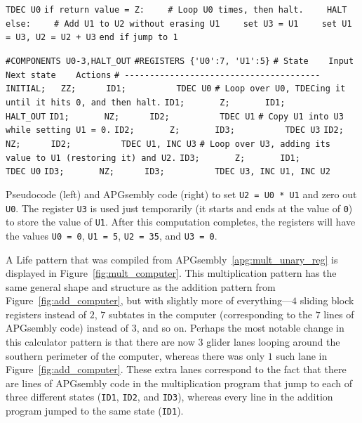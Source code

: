 \begin{apgsembly}
	\centering
	\begin{minipage}[t]{.49\textwidth}
		\begin{algorithmic}[1]\small
			\State\texttt{TDEC U0}
			\State\texttt{if return value = Z:}
			\State\texttt{~~~~\# Loop U0 times, then halt.}
			\State\texttt{~~~~HALT}
			\State\texttt{else:}
			\State\texttt{~~~~\# Add U1 to U2 without erasing U1}
			\State\texttt{~~~~set U3 = U1}
			\State\texttt{~~~~set U1 = U3, U2 = U2 + U3}
			\State\texttt{end if}
			\State\texttt{jump to 1}
		\end{algorithmic}
	\end{minipage}\hfill{\color{gray}\vline}\hfill
	\begin{minipage}[t]{.49\textwidth}
		\begin{algorithmic}\tiny
			\State \verb|#COMPONENTS U0-3,HALT_OUT|
			\State \verb|#REGISTERS {'U0':7, 'U1':5}|
			\State \verb|# State    Input    Next state    Actions|
			\State \verb|# ---------------------------------------|
			\State \verb|INITIAL;   ZZ;      ID1;          TDEC U0|
			\State \verb||
			\State \verb|# Loop over U0, TDECing it until it hits 0, and then halt.|
			\State \verb|ID1;       Z;       ID1;          HALT_OUT|
			\State \verb|ID1;       NZ;      ID2;          TDEC U1|
			\State \verb||
			\State \verb|# Copy U1 into U3 while setting U1 = 0.|
			\State \verb|ID2;       Z;       ID3;          TDEC U3|
			\State \verb|ID2;       NZ;      ID2;          TDEC U1, INC U3|
			\State \verb||
			\State \verb|# Loop over U3, adding its value to U1 (restoring it) and U2.|
			\State \verb|ID3;       Z;       ID1;          TDEC U0|
			\State \verb|ID3;       NZ;      ID3;          TDEC U3, INC U1, INC U2|
		\end{algorithmic}
	\end{minipage}
	\caption{Pseudocode (left) and APGsembly code (right) to set \texttt{U2 = U0 * U1} and zero out \texttt{U0}. The register \texttt{U3} is used just temporarily (it starts and ends at the value of \texttt{0}) to store the value of \texttt{U1}. After this computation completes, the registers will have the values \texttt{U0 = 0}, \texttt{U1 = 5}, \texttt{U2 = 35}, and \texttt{U3 = 0}.}\label{apg:mult_unary_reg}
\end{apgsembly}

A Life pattern that was compiled from APGsembly~\ref{apg:mult_unary_reg} is displayed in Figure~\ref{fig:mult_computer}. This multiplication pattern has the same general shape and structure as the addition pattern from Figure~\ref{fig:add_computer}, but with slightly more of everything---$4$ sliding block registers instead of $2$, $7$ subtates in the computer (corresponding to the $7$ lines of APGsembly code) instead of $3$, and so on. Perhaps the most notable change in this calculator pattern is that there are now $3$ glider lanes looping around the southern perimeter of the computer, whereas there was only $1$ such lane in Figure~\ref{fig:add_computer}. These extra lanes correspond to the fact that there are lines of APGsembly code in the multiplication program that jump to each of three different states (\texttt{ID1}, \texttt{ID2}, and \texttt{ID3}), whereas every line in the addition program jumped to the same state (\texttt{ID1}).

